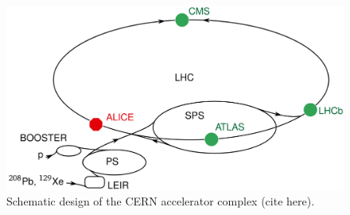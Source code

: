 \documentclass[12pt,a4paper]{report}
\begin{document}
\begin{figure}[tb!]
\centering
\includegraphics[width=12cm]{Plots/LHC.png}  
\caption{Schematic design of the CERN accelerator complex (cite here).}
\label{LHC}
\end{figure}
\end{document}
